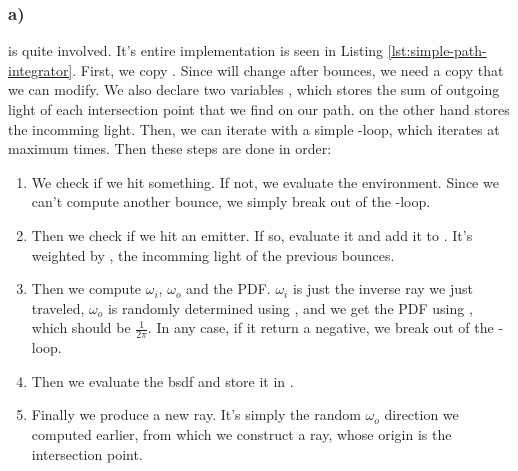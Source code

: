 \subsubsection*{a)}

 is quite involved. It's entire implementation is seen in Listing \ref{lst:simple-path-integrator}. First, we copy . Since  will change after bounces, we need a copy that we can modify. We also declare two variables , which stores the sum of outgoing light of each intersection point that we find on our path.  on the other hand stores the incomming light. Then, we can iterate with a simple -loop, which iterates at maximum  times. Then these steps are done in order:

{
\renewcommand{\labelenumi}{\arabic{enumi}.}
\begin{enumerate}
\item
We check if we hit something. If not, we evaluate the environment. Since we can't compute another bounce, we simply break out of the -loop.

\item
Then we check if we hit an emitter. If so, evaluate it and add it to . It's weighted by , the incomming light of the previous bounces.

\item
Then we compute $\omega_i$, $\omega_o$ and the PDF. $\omega_i$ is just the inverse ray we just traveled, $\omega_o$ is randomly determined using , and we get the PDF using , which should be $\frac{1}{2\pi}$. In any case, if it return a negative, we break out of the -loop.

\item
Then we evaluate the bsdf and store it in .

\item
Finally we produce a new ray. It's simply the random $\omega_o$ direction we computed earlier, from which we construct a ray, whose origin is the intersection point.

\end{enumerate}
}

